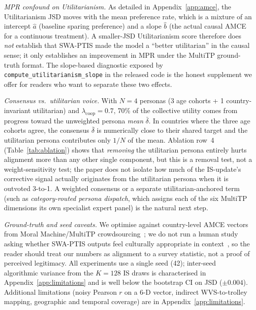\documentclass{article}
\begin{document}
\emph{MPR confound on Utilitarianism.} As detailed in Appendix~\ref{app:amce},
the Utilitarianism JSD moves with the mean preference rate, which is a mixture
of an intercept $\hat{a}$ (baseline sparing preference) and a slope $\hat{b}$
(the actual causal AMCE for a continuous treatment). A smaller-JSD Utilitarianism
score therefore does \emph{not} establish that SWA-PTIS made the model a
``better utilitarian'' in the causal sense; it only establishes an improvement
in MPR under the MultiTP ground-truth format. The slope-based diagnostic
exposed by \texttt{compute\_utilitarianism\_slope} in the released code is the
honest supplement we offer for readers who want to separate these two effects.

\emph{Consensus vs.\ utilitarian voice.} With $N{=}4$ personas (3 age cohorts
+ 1 country-invariant utilitarian) and $\lambda_{\text{coop}}{=}0.7$, 70\% of
the collective utility comes from progress toward the unweighted persona
\emph{mean} $\bar{\delta}$. In countries where the three age cohorts agree,
the consensus $\bar{\delta}$ is numerically close to their shared target and
the utilitarian persona contributes only $1/N$ of the mean. Ablation row~4
(Table~\ref{tab:ablation}) shows that \emph{removing} the utilitarian persona
entirely hurts alignment more than any other single component, but this is a
removal test, not a weight-sensitivity test; the paper does not isolate how
much of the IS-update's corrective signal actually originates from the
utilitarian persona when it is outvoted 3-to-1. A weighted consensus or a separate
utilitarian-anchored term (such as \emph{category-routed persona dispatch}, which
assigns each of the six MultiTP dimensions its own specialist expert panel) is the
natural next step.

\emph{Ground-truth and seed caveats.} We optimise against country-level AMCE
vectors from Moral Machine/MultiTP crowdsourcing~\citep{awad2018moral,jin2025multitp};
we do not run a human study asking whether SWA-PTIS outputs feel culturally
appropriate in context~\citep{atari2023humans}, so the reader should treat our
numbers as alignment to a survey statistic, not a proof of perceived
legitimacy. All experiments use a single seed (42); inter-seed algorithmic
variance from the $K{=}128$ IS draws is characterised in
Appendix~\ref{app:limitations} and is well below the bootstrap CI on JSD
($\pm 0.004$). Additional limitations (noisy Pearson $r$ on a 6-D vector,
indirect WVS-to-trolley mapping, geographic and temporal coverage) are in
Appendix~\ref{app:limitations}.
\end{document}

